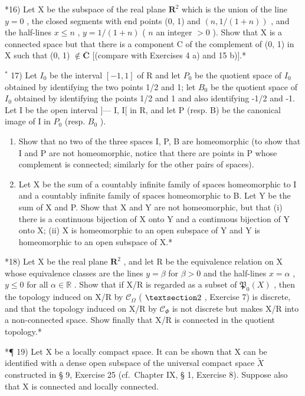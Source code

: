 *16) Let X be the subspace of the real plane \(\mathbf{R}^2\) which is the union of the line \(y = 0\) , the closed segments with end points (0, 1) and \((n, 1/(1 + n))\) , and the half-lines \(x \leqslant n\) , \(y = 1/(1 + n)\) ( \(n\) an integer \(>0\) ). Show that X is a connected space but that there is a component C of the complement of (0, 1) in X such that (0, 1) \(\notin \overline{\mathbf{C}}\) {[}(compare with Exercises 4 a) and 15 b){]}.*

\(^{*}\) 17) Let \(I_{0}\) be the interval \([-1,1]\) of R and let \(P_{0}\) be the quotient space of \(I_{0}\) obtained by identifying the two points 1/2 and 1; let \(B_{0}\) be the quotient space of \(I_{0}\) obtained by identifying the points 1/2 and 1 and also identifying -1/2 and -1. Let I be the open interval {]}--- I, I{[} in R, and let P (resp. B) be the canonical image of I in \(P_{0}\) (resp. \(B_{0}\) ).

\begin{enumerate}
\def\labelenumi{\alph{enumi})}
\item
  Show that no two of the three spaces I, P, B are homeomorphic (to show that I and P are not homeomorphic, notice that there are points in P whose complement is connected; similarly for the other pairs of spaces).
\item
  Let X be the sum of a countably infinite family of spaces homeomorphic to I and a countably infinite family of spaces homeomorphic to B. Let Y be the sum of X and P. Show that X and Y are not homeomorphic, but that (i) there is a continuous bijection of X onto Y and a continuous bijection of Y onto X; (ii) X is homeomorphic to an open subspace of Y and Y is homeomorphic to an open subspace of X.*
\end{enumerate}

*18) Let X be the real plane \(\mathbf{R}^2\) , and let R be the equivalence relation on X whose equivalence classes are the lines \(y = \beta\) for \(\beta > 0\) and the half-lines \(x = \alpha\) , \(y \leqslant 0\) for all \(\alpha \in \mathbb{R}\) . Show that if X/R is regarded as a subset of \(\mathfrak{P}_0(X)\) , then the topology induced on X/R by \(\mathcal{C}_{\Omega}\) ( \(\S 2\) , Exercise 7) is discrete, and that the topology induced on X/R by \(\mathcal{C}_{\Phi}\) is not discrete but makes X/R into a non-connected space. Show finally that X/R is connected in the quotient topology.*

*¶ 19) Let X be a locally compact space. It can be shown that X can be identified with a dense open subspace of the universal compact space \(\tilde{X}\) constructed in § 9, Exercise 25 (cf.~Chapter IX, § 1, Exercise 8). Suppose also that X is connected and locally connected.

